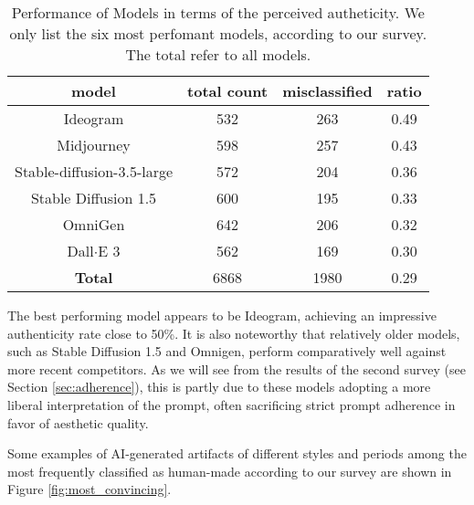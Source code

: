 \documentclass[sn-mathphys]{sn-jnl}
\begin{document}
\begin{table}[h]
    \centering
    \begin{tabular}{|c|c|c|c|}\hline
         {\bf model} & {\bf total count} & {\bf misclassified} & {\bf ratio}\\\hline
        Ideogram & 532  & 263  & 0.49\\\hline
        Midjourney  & 598  & 257 & 0.43 \\\hline
        Stable-diffusion-3.5-large & 572 & 204 & 0.36 \\\hline
        Stable Diffusion 1.5 & 600 & 195 & 0.33 \\\hline 
        OmniGen & 642 & 206 & 0.32 \\\hline
        Dall$\cdot$E 3 & 562 & 169 & 0.30 \\\hline
        {\bf Total} & 6868  & 1980 & 0.29 \\\hline
    \end{tabular}
    \caption{Performance of Models in terms of the perceived 
    autheticity. We only list the six most perfomant models, according to our survey. The total refer to all models.}
    \label{tab:authenticity}
\end{table}
The best performing model appears to be Ideogram, achieving an impressive authenticity rate close to 50\%. It is also noteworthy that relatively older models, such as Stable Diffusion 1.5 and Omnigen, perform comparatively well against more recent competitors. As we will see from the results of the second survey (see Section \ref{sec:adherence}), this is partly due to these models adopting a more liberal interpretation of the prompt, often sacrificing strict prompt adherence in favor of aesthetic quality.

Some examples of AI-generated artifacts of different styles and periods among the most frequently classified as human-made according to our survey are shown in Figure \ref{fig:most_convincing}.
\end{document}
